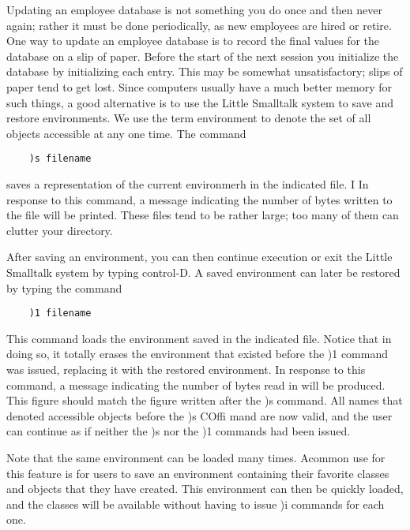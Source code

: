 
Updating an employee database is not something you do once and then
never again; rather it must be done periodically, as new employees are
hired or retire. One way to update an employee database is to record the
final values for the database on a slip of paper. Before the start of the next
session you initialize the database by initializing each entry. This may be
somewhat unsatisfactory; slips of paper tend to get lost. Since computers
usually have a much better memory for such things, a good alternative is
to use the Little Smalltalk system to save and restore environments. We
use the term environment to denote the set of all objects accessible at any
one time. The command

\begin{lstlisting}
    )s filename
\end{lstlisting}

\noindent
saves a representation of the current environmerh in the indicated file. I In
response to this command, a message indicating the number of bytes
written to the file will be printed. These files tend to be rather large; too
many of them can clutter your directory.

After saving an environment, you can then continue execution or exit
the Little Smalltalk system by typing control-D. A saved environment can
later be restored by typing the command
\begin{lstlisting}
    )1 filename
\end{lstlisting}

\noindent
This command loads the environment saved in the indicated file. Notice
that in doing so, it totally erases the environment that existed before the
)1 command was issued, replacing it with the restored environment. In
response to this command, a message indicating the number of bytes read
in will be produced. This figure should match the figure written after the
)s command. All names that denoted accessible objects before the )s COffi
mand are now valid, and the user can continue as if neither the )s nor the
)1 commands had been issued.

Note that the same environment can be loaded many times. Acommon
use for this feature is for users to save an environment containing their
favorite classes and objects that they have created. This environment can
then be quickly loaded, and the classes will be available without having to
issue )i commands for each one.
